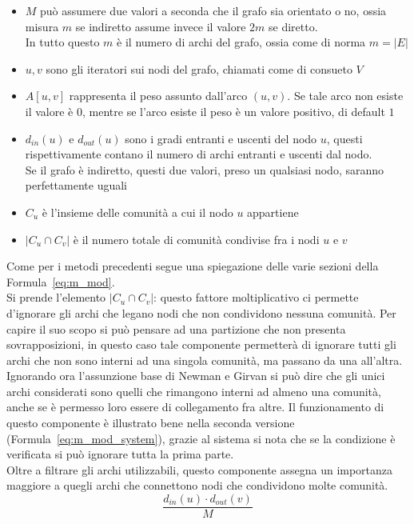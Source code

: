 \begin{itemize}
	\item $M$ può assumere due valori a seconda che il grafo sia orientato o no, ossia misura $m$ se indiretto assume invece il valore $2m$ se diretto.\\
	In tutto questo $m$ è il numero di archi del grafo, ossia come di norma $m=|E|$
	\item $u,v$ sono gli iteratori sui nodi del grafo, chiamati come di consueto $V$
	\item $A \left[ u,v \right]$ rappresenta il peso assunto dall'arco $(u, v)$. Se tale arco non esiste il valore è $0$, mentre se l'arco esiste il peso è un valore positivo, di default $1$
	\item $d_{in}\left(u\right)$ e $d_{out}\left(u\right)$ sono i gradi entranti e uscenti del nodo $u$, questi rispettivamente contano il numero di archi entranti e uscenti dal nodo.\\
	Se il grafo è indiretto, questi due valori, preso un qualsiasi nodo, saranno perfettamente uguali
	\item $C_u$ è l'insieme delle comunità a cui il nodo $u$ appartiene
	\item $|C_u \cap C_v|$ è il numero totale di comunità condivise fra i nodi $u$ e $v$
\end{itemize}
%
Come per i metodi precedenti segue una spiegazione delle varie sezioni della Formula~\ref{eq:m_mod}.\\
Si prende l'elemento $ |C_u \cap C_v|$: questo fattore moltiplicativo ci permette d'ignorare gli archi che legano nodi che non condividono nessuna comunità. Per capire il suo scopo si può pensare ad una partizione che non presenta sovrapposizioni, in questo caso tale componente permetterà di ignorare tutti gli archi che non sono interni ad una singola comunità, ma passano da una all'altra. Ignorando ora l'assunzione base di Newman e Girvan  si può dire che gli unici archi considerati sono quelli che rimangono interni ad almeno una comunità, anche se è permesso loro essere di collegamento fra altre. Il funzionamento di questo componente è illustrato bene nella seconda versione (Formula~\ref{eq:m_mod_system}), grazie al sistema si nota che se la condizione è verificata si può ignorare tutta la prima parte.\\
Oltre a filtrare gli archi utilizzabili, questo componente assegna un importanza maggiore a quegli archi che connettono nodi che condividono molte comunità.
\begin{equation}
	\frac{ d_{in}\left(u\right) \cdot d_{out}\left(v\right) }{M}
	\label{eq:d_in-out}
\end{equation}
